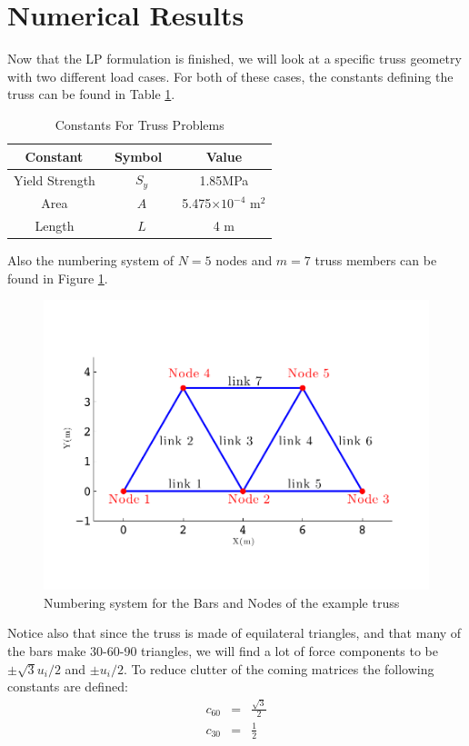 \documentclass[12pt]{article}
\begin{document}
\section{Numerical Results}
Now that the LP formulation is finished, we will look at a specific truss geometry with two different load cases.  For both of these cases, the constants defining the truss can be found in Table \ref{tab:Constants}. 
\begin{table}[htb!]
\caption{Constants For Truss Problems}
\label{tab:Constants}
\begin{center}
  \begin{tabular}{@{} |c|c|c| @{}}
    \hline
     Constant\ & Symbol\ & Value\\ 
    \hline
\hline
   Yield Strength\ & $S_y$&1.85MPa \\ 
\hline
  Area\ &$A$&5.475$\times10^{-4}$ m$^2$ \\
    \hline
  Length\ &$L$&4 m\\
    \hline
  \end{tabular}
\end{center}
\end{table}
Also the numbering system of $N=5$ nodes and $m=7$ truss members can be found in Figure \ref{fig:NodesBars}. 
\begin{figure}[htb!]
	\begin{center}
		\includegraphics[width=1\textwidth]{TrussFSNodesBars2}
	\end{center}
	\caption{Numbering system for the Bars and Nodes of the example truss}
	\label{fig:NodesBars}
\end{figure}
Notice also that since the truss is made of equilateral triangles, and that many of the bars make 30-60-90 triangles, we will find a lot of force components to be $\pm \sqrt{3}u_i/2$ and $\pm u_i/2$.  To reduce clutter of the coming matrices the following constants are defined:
\begin{eqnarray}
c_{60} &=& \frac{\sqrt{3}}{2}\\
c_{30} &=& \frac{1}{2}
\end{eqnarray}
\end{document}
